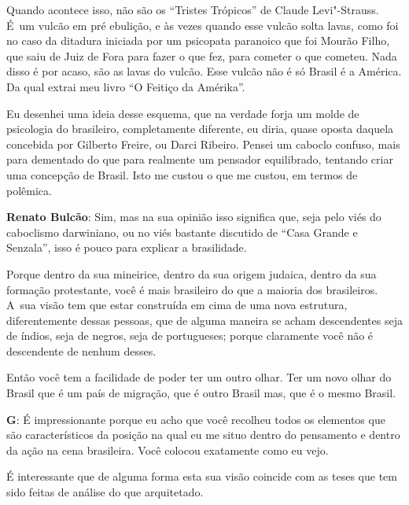  

Quando acontece isso, não são os ``Tristes Trópicos'' de Claude
Levi"-Strauss. É~um vulcão em pré ebulição, e às vezes quando esse vulcão
solta lavas, como foi no caso da ditadura iniciada por um psicopata
paranoico que foi Mourão Filho, que saiu de Juiz de Fora para fazer o
que fez, para cometer o que cometeu. Nada disso é por acaso, são as
lavas do vulcão. Esse vulcão não é só Brasil é a América. Da qual extrai
meu livro ``O Feitiço da Amérika''.

 

Eu desenhei uma ideia desse esquema, que na verdade forja um molde de
psicologia do brasileiro, completamente diferente, eu diria, quase
oposta daquela concebida por Gilberto Freire, ou Darci Ribeiro. Pensei
um caboclo confuso, mais para dementado do que para realmente um
pensador equilibrado, tentando criar uma concepção de Brasil. Isto me
custou o que me custou, em termos de polêmica.

 

\textbf{Renato Bulcão}: Sim, mas na sua opinião isso significa que, seja
pelo viés do caboclismo darwiniano, ou no viés bastante discutido de
``Casa Grande e Senzala'', isso é pouco para explicar a brasilidade.

 

Porque dentro da sua mineirice, dentro da sua origem judaica, dentro da
sua formação protestante, você é mais brasileiro do que a maioria dos
brasileiros. A~sua visão tem que estar construída em cima de uma nova
estrutura, diferentemente dessas pessoas, que de alguma maneira se acham
descendentes seja de índios, seja de negros, seja de portugueses; porque
claramente você não é descendente de nenhum desses.

 

Então você tem a facilidade de poder ter um outro olhar. Ter um novo
olhar do Brasil que é um país de migração, que é outro Brasil mas, que é
o mesmo Brasil.

 

\textbf{G}: É impressionante porque eu acho que você recolheu todos os
elementos que são característicos da posição na qual eu me situo dentro
do pensamento e dentro da ação na cena brasileira. Você colocou
exatamente como eu vejo.

 

É interessante que de alguma forma esta sua visão coincide com as teses
que tem sido feitas de análise do que arquitetado.

 

